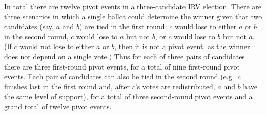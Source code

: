 \documentclass[11pt,a4paper]{article}
\begin{document}
In total there are twelve pivot events in a three-candidate IRV election. %
There are three scenarios in which a single ballot could determine the winner given that two candidates (say, $a$ and $b$) are tied in the first round: %
$c$ would lose to either $a$ or $b$ in the second round, $c$ would lose to $a$ but not $b$, or $c$ would lose to $b$ but not $a$. (If $c$ would not lose to either $a$ or $b$, then it is not a pivot event, as the winner does not depend on a single vote.) Thus for each of three pairs of candidates there are three first-round pivot events, for a total of nine first-round pivot events. Each pair of candidates can also be tied in the second round (e.g.\ $c$ finishes last in the first round and, after $c$'s votes are redistributed, $a$ and $b$ have the same level of support), for a total of three second-round pivot events and a grand total of twelve pivot events. 
\end{document}
